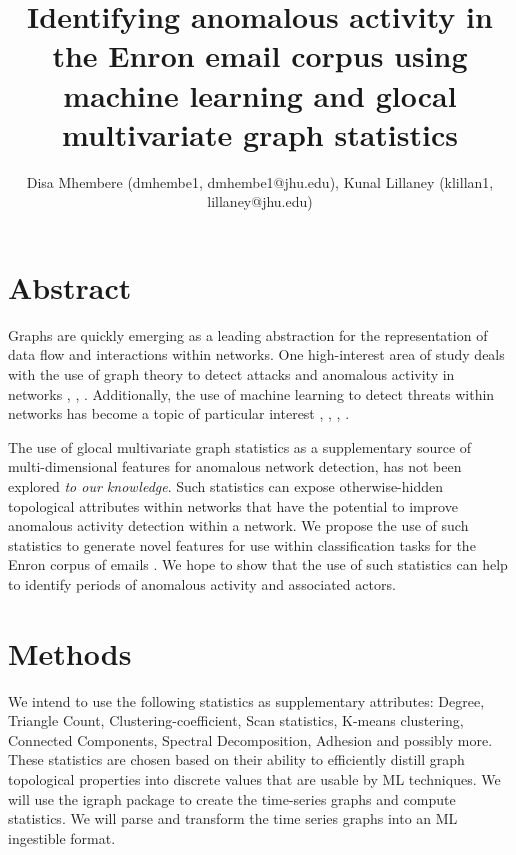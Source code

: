 \documentclass[10pt]{article}
\title{Identifying anomalous activity in the Enron email corpus using machine learning and glocal multivariate graph statistics}
\author{Disa Mhembere (dmhembe1, dmhembe1@jhu.edu), Kunal Lillaney (klillan1, lillaney@jhu.edu)}
\date{}
\begin{document}
\maketitle

\section{Abstract}
Graphs are quickly emerging as a leading abstraction for the representation of data flow and interactions within networks.
One high-interest area of study deals with the use of graph theory to detect attacks and anomalous activity in networks 
\cite{priebe2005scan}, \cite{park2009anomaly}, \cite{park2013anomaly}.
Additionally, the use of machine learning to detect threats within networks has become a topic of particular interest 
\cite{mahoney2003machine}, \cite{shon2005machine}, \cite{sommer2010outside}, \cite{shon2007hybrid}.

The use of glocal multivariate graph statistics \cite{mhembere2013computing} as a supplementary source of multi-dimensional 
features for anomalous network detection, has not been explored \textit{to our knowledge}. Such statistics can expose otherwise-hidden
topological attributes within networks that have the potential to improve anomalous activity detection within a network. 
We propose the use of such statistics to generate novel features for use within classification tasks for the Enron corpus 
of emails \cite{enronrepo2009}. We hope to show that the use of such statistics can help to identify periods of anomalous 
activity and associated actors.

\section{Methods} %
We intend to use the following statistics as supplementary attributes: Degree, Triangle Count, Clustering-coefficient,
Scan statistics, K-means clustering, Connected Components, Spectral Decomposition, Adhesion and possibly more. 
These statistics are chosen based on their ability to efficiently distill graph topological properties into discrete
values that are usable by ML techniques. We will use the igraph \cite{igraph2006} package to create the time-series
graphs and compute statistics. We will parse and transform the time series graphs into an ML ingestible format. \newline
\end{document}
